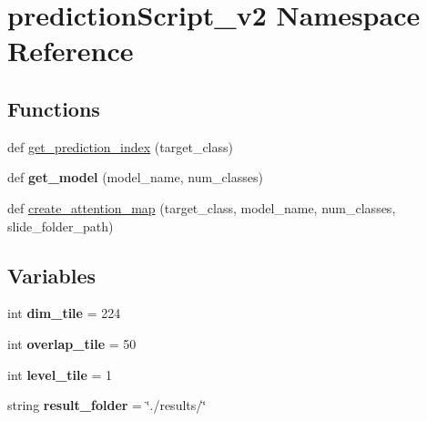 \hypertarget{namespacepredictionScript__v2}{}\section{prediction\+Script\+\_\+v2 Namespace Reference}
\label{namespacepredictionScript__v2}
\subsection*{Functions}
\begin{DoxyCompactItemize}
\item 
def \mbox{\hyperlink{namespacepredictionScript__v2_a4a283a90ac878184d28aaa1803b25869}{get\+\_\+prediction\+\_\+index}} (target\+\_\+class)
\item 
\mbox{\label{namespacepredictionScript__v2_a1faea6d0bfb5cae21b0939602403580d}} 
def {\bfseries get\+\_\+model} (model\+\_\+name, num\+\_\+classes)
\item 
def \mbox{\hyperlink{namespacepredictionScript__v2_a2c9da50db5049263eaff30deb3dfe287}{create\+\_\+attention\+\_\+map}} (target\+\_\+class, model\+\_\+name, num\+\_\+classes, slide\+\_\+folder\+\_\+path)
\end{DoxyCompactItemize}
\subsection*{Variables}
\begin{DoxyCompactItemize}
\item 
\mbox{\label{namespacepredictionScript__v2_a492213a68d1e4055fa3c42c45707f196}} 
int {\bfseries dim\+\_\+tile} = 224
\item 
\mbox{\label{namespacepredictionScript__v2_abf074e6cfa751ed6c36337475c5d29a9}} 
int {\bfseries overlap\+\_\+tile} = 50
\item 
\mbox{\label{namespacepredictionScript__v2_a888cb4cb234dcaae358e8076262e9cf5}} 
int {\bfseries level\+\_\+tile} = 1
\item 
\mbox{\label{namespacepredictionScript__v2_ac5c71860d8ff48e28d8e568b5b53cf88}} 
string {\bfseries result\+\_\+folder} = \char`\"{}./results/\char`\"{}
\end{DoxyCompactItemize}



